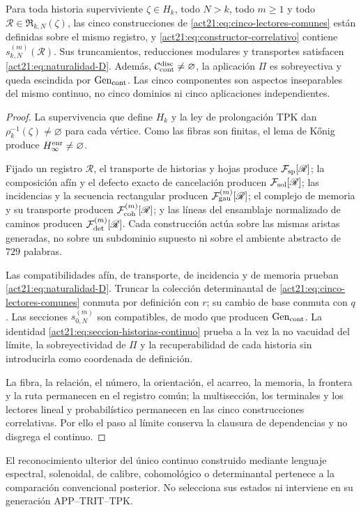 \begin{theorem}
\label{act21:thm:correlacion-cinco}
Para toda historia superviviente \(\zeta\in H_k\), todo \(N>k\), todo
\(m\geq1\) y todo \(\mathscr R\in\mathfrak R_{k,N}(\zeta)\), las cinco
construcciones de \eqref{act21:eq:cinco-lectores-comunes} están definidas sobre el
mismo registro, y \eqref{act21:eq:constructor-correlativo} contiene
\(s_{k,N}^{(m)}(\mathscr R)\). Sus truncamientos, reducciones modulares y
transportes satisfacen \eqref{act21:eq:naturalidad-D}. Además,
\(\mathcal C_{\rm cont}^{\rm disc}\neq\varnothing\), la aplicación \(\Pi\)
es sobreyectiva y queda escindida por \(\operatorname{Gen}_{\rm cont}\). Las
cinco componentes son aspectos inseparables del mismo continuo, no cinco
dominios ni cinco aplicaciones independientes.
\end{theorem}

\begin{proof}
La supervivencia que define \(H_k\) y la ley de prolongación TPK dan
\(\rho_k^{-1}(\zeta)\neq\varnothing\) para cada vértice. Como las fibras son
finitas, el lema de Kőnig produce \(H_\infty^{\rm enr}\neq\varnothing\).

Fijado un registro \(\mathscr R\), el transporte de historias y hojas produce
\(\mathcal F_{\rm sp}[\mathscr R]\); la composición afín y el defecto exacto
de cancelación producen \(\mathcal F_{\rm sol}[\mathscr R]\); las incidencias
y la secuencia rectangular producen \(\mathcal F_{\rm gau}^{(m)}[\mathscr R]\);
el complejo de memoria y su transporte producen
\(\mathcal F_{\rm coh}^{(m)}[\mathscr R]\); y las líneas del ensamblaje
normalizado de caminos producen \(\mathcal F_{\rm det}^{(m)}[\mathscr R]\).
Cada construcción actúa sobre las mismas aristas generadas, no sobre un
subdominio supuesto ni sobre el ambiente abstracto de \(729\) palabras.

Las compatibilidades afín, de transporte, de incidencia y de memoria prueban
\eqref{act21:eq:naturalidad-D}. Truncar la colección determinantal de
\eqref{act21:eq:cinco-lectores-comunes} conmuta por
definición con \(r\); su cambio de base conmuta con \(q\). Las secciones
\(s_{0,N}^{(m)}\) son compatibles, de modo que producen
\(\operatorname{Gen}_{\rm cont}\). La identidad
\eqref{act21:eq:seccion-historias-continuo} prueba a la vez la no
vacuidad del límite, la sobreyectividad de \(\Pi\) y la recuperabilidad de cada
historia sin introducirla como coordenada de definición.

La fibra, la relación, el número, la orientación, el acarreo, la memoria, la
frontera y la ruta permanecen en el registro común; la multisección, los
terminales y los lectores lineal y probabilístico permanecen en las cinco
construcciones correlativas. Por ello el paso al límite conserva la clausura de
dependencias y no disgrega el continuo.
\end{proof}

El reconocimiento ulterior del único continuo construido mediante lenguaje
espectral, solenoidal, de calibre, cohomológico o determinantal pertenece a la
comparación convencional posterior. No selecciona sus estados ni interviene en
su generación APP--TRIT--TPK.
